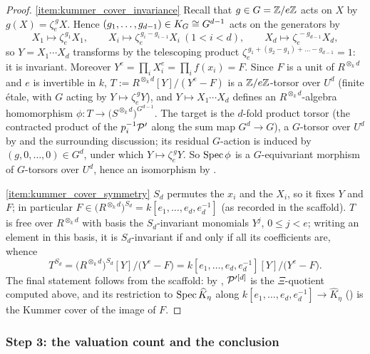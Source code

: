 \begin{proof}
    \ref{item:kummer_cover_invariance}
    Recall that $g \in G = \mathbb{Z}/e\mathbb{Z}$ acts on $X$ by $g(X) = \zeta_e^{\,g} X$. Hence
    $(g_1, \dots, g_{d-1}) \in K_{G} \cong G^{d-1}$ acts on the generators by
    \[
        X_1 \mapsto \zeta_e^{\,g_1} X_1, \qquad
        X_i \mapsto \zeta_e^{\,g_i - g_{i-1}} X_i \ (1 < i < d), \qquad
        X_d \mapsto \zeta_e^{\,-g_{d-1}} X_d,
    \]
    so $Y = X_1 \cdots X_d$ transforms by the telescoping product
    $\zeta_e^{\,g_1 + (g_2 - g_1) + \dots - g_{d-1}} = 1$: it is invariant.
    Moreover $Y^e = \prod_i X_i^e = \prod_i f(x_i) = F$.
    Since $F$ is a unit of $R^{\otimes_k d}$ and $e$ is invertible in $k$,
    $T := R^{\otimes_k d}[Y]/(Y^e - F)$ is a $\mathbb{Z}/e\mathbb{Z}$-torsor over $U^d$ (finite
    étale, with $G$ acting by $Y \mapsto \zeta_e^{\,g} Y$), and
    $Y \mapsto X_1 \cdots X_d$ defines an $R^{\otimes_k d}$-algebra homomorphism
    $\phi : T \to \bigl(S^{\otimes_k d}\bigr)^{G^{d-1}}$. The target is the
    $d$-fold product torsor (the contracted product of the $p_i^{-1}\mathcal{P}'$ along
    the sum map $G^d \to G$), a $G$-torsor over $U^d$ by
     and the surrounding discussion; its
    residual $G$-action is induced by $(g, 0, \dots, 0) \in G^d$, under which
    $Y \mapsto \zeta_e^{\,g} Y$. So $\operatorname{Spec} \phi$ is a $G$-equivariant morphism of
    $G$-torsors over $U^d$, hence an isomorphism by
    .

    \ref{item:kummer_cover_symmetry} $S_d$ permutes the $x_i$ and the $X_i$, so it
    fixes $Y$ and $F$; in particular
    $F \in \bigl(R^{\otimes_k d}\bigr)^{S_d} = k[e_1, \dots, e_d, e_d^{-1}]$ (as
    recorded in the scaffold). $T$ is free over $R^{\otimes_k d}$ with basis the
    $S_d$-invariant monomials $Y^j$, $0 \leq j < e$; writing an element in this
    basis, it is $S_d$-invariant if and only if all its coefficients are, whence
    \[
        T^{S_d}
        = \bigl(R^{\otimes_k d}\bigr)^{S_d}[Y]\big/\bigl(Y^e - F\bigr)
        = k[e_1, \dots, e_d, e_d^{-1}][Y]\big/\bigl(Y^e - F\bigr).
    \]
    The final statement follows from the scaffold: by
    , $\mathcal{P}'^{[d]}$ is the $\Xi$-quotient computed
    above, and its restriction to $\operatorname{Spec} \widehat K_\eta$ along
    $k[e_1, \dots, e_d, e_d^{-1}] \to \widehat K_\eta$
    () is the Kummer cover of the image of
    $F$.
\end{proof}

\subsubsection*{Step 3: the valuation count and the conclusion}

